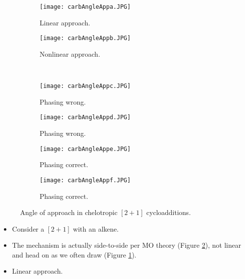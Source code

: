 \documentclass[../notes.tex]{subfiles}
\begin{document}
\begin{itemize}
    \begin{figure}[h!]
        \centering
        \begin{subfigure}[b]{0.21\linewidth}
            \centering
            \texttt{[image: carbAngleAppa.JPG]}
            \caption{Linear approach.}
            \label{fig:carbAngleAppa}
        \end{subfigure}
        \begin{subfigure}[b]{0.21\linewidth}
            \centering
            \texttt{[image: carbAngleAppb.JPG]}
            \caption{Nonlinear approach.}
            \label{fig:carbAngleAppb}
        \end{subfigure}\\[2em]
        \begin{subfigure}[b]{0.25\linewidth}
            \centering
            \texttt{[image: carbAngleAppc.JPG]}
            \caption{Phasing wrong.}
            \label{fig:carbAngleAppc}
        \end{subfigure}
        \begin{subfigure}[b]{0.24\linewidth}
            \centering
            \texttt{[image: carbAngleAppd.JPG]}
            \caption{Phasing wrong.}
            \label{fig:carbAngleAppd}
        \end{subfigure}
        \begin{subfigure}[b]{0.24\linewidth}
            \centering
            \texttt{[image: carbAngleAppe.JPG]}
            \caption{Phasing correct.}
            \label{fig:carbAngleAppe}
        \end{subfigure}
        \begin{subfigure}[b]{0.25\linewidth}
            \centering
            \texttt{[image: carbAngleAppf.JPG]}
            \caption{Phasing correct.}
            \label{fig:carbAngleAppf}
        \end{subfigure}
        \caption{Angle of approach in chelotropic $[2+1]$ cycloadditions.}
        \label{fig:carbAngleApp}
    \end{figure}
    \begin{itemize}
        \item Consider a $[2+1]$ with an alkene.
        \item The mechanism is actually side-to-side per MO theory (Figure \ref{fig:carbAngleAppb}), not linear and head on as we often draw (Figure \ref{fig:carbAngleAppa}).
        \item Linear approach.

\end{itemize}
\end{itemize}
\end{document}
